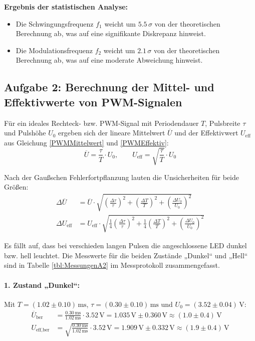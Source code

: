 \documentclass[12pt,a4paper,titlepage]{scrartcl}
\numberwithin{equation}{section}
\numberwithin{table}{section}
\numberwithin{figure}{section}
\begin{document}
\begin{resultbox}
    
    \textbf{Ergebnis der statistischen Analyse:}
    \begin{itemize}
        \item Die Schwingungsfrequenz $f_1$ weicht um $5.5\,\sigma$ von der theoretischen Berechnung ab, was auf eine signifikante Diskrepanz hinweist.
        \item Die Modulationsfrequenz $f_2$ weicht um $2.1\,\sigma$ von der theoretischen Berechnung ab, was auf eine moderate Abweichung hinweist.
    \end{itemize}
\end{resultbox}
\medskip


\subsection{Aufgabe 2: Berechnung der Mittel- und Effektivwerte von PWM-Signalen}
Für ein ideales Rechteck- bzw. PWM-Signal mit Periodendauer $T$, Pulsbreite $\tau$ und Pulshöhe $U_0$ ergeben sich der lineare Mittelwert $\overline{U}$ und der Effektivwert $U_{\text{eff}}$ aus Gleichung \ref{PWMMittelwert} und \ref{PWMEffektiv}:
\begin{equation}
    \overline{U} = \frac{\tau}{T} \cdot U_0, \qquad U_{\text{eff}} = \sqrt{\frac{\tau}{T}} \cdot U_0
\end{equation}

Nach der Gaußschen Fehlerfortpflanzung lauten die Unsicherheiten für beide Größen:
\begin{align}
    \Delta{\overline{U}} &= \overline{U} \cdot \sqrt{\left(\frac{\Delta\tau}{\tau}\right)^2 + \left(\frac{\Delta T}{T}\right)^2 + \left(\frac{\Delta U_0}{U_0}\right)^2} \\
    \Delta{U_{\text{eff}}} &= U_{\text{eff}} \cdot \sqrt{\frac{1}{4}\left(\frac{\Delta\tau}{\tau}\right)^2 + \frac{1}{4}\left(\frac{\Delta T}{T}\right)^2 + \left(\frac{\Delta U_0}{U_0}\right)^2}
\end{align}

Es fällt auf, dass bei verschieden langen Pulsen die angeschlossene LED dunkel bzw. hell leuchtet. Die Messwerte für die beiden Zustände „Dunkel“ und „Hell“ sind in Tabelle \ref{tbl:MessungenA2} im Messprotokoll zusammengefasst.
\paragraph{1. Zustand „Dunkel“:}
Mit $T = (1.02 \pm 0.10)\,\text{ms}$, $\tau = (0.30 \pm 0.10)\,\text{ms}$ und $U_0 = (3.52 \pm 0.04)\,\text{V}$:
\begin{align}
    \overline{U}_{\text{ber}} &= \frac{0.30\,\text{ms}}{1.02\,\text{ms}} \cdot 3.52\,\text{V} = 1.035\,\text{V} \pm 0.360\,\text{V} \approx (1.0 \pm 0.4)\,\text{V} \\
    U_{\text{eff,ber}} &= \sqrt{\frac{0.30\,\text{ms}}{1.02\,\text{ms}}} \cdot 3.52\,\text{V} = 1.909\,\text{V} \pm 0.332\,\text{V} \approx (1.9 \pm 0.4)\,\text{V}
\end{align}
\end{document}
